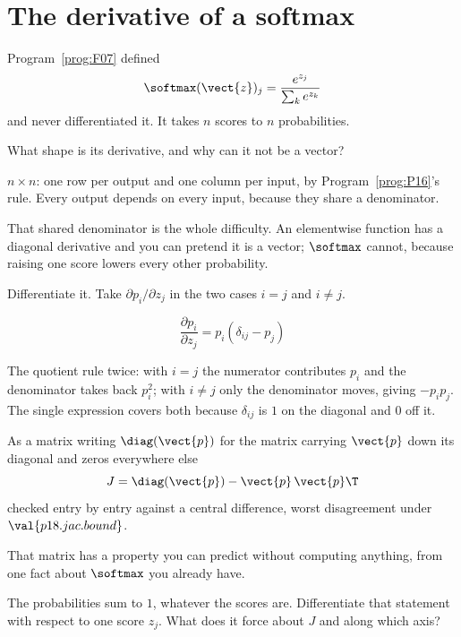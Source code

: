\section{The derivative of a softmax}
\label{sec:P18-softmax-jacobian}

\begin{fr}
Program~\ref{prog:F07} defined
\[ \softmax(\vect{z})_j = \frac{e^{z_j}}{\sum_k e^{z_k}} \]
and never differentiated it. It takes $n$ scores to $n$ probabilities.

What shape is its derivative, and why can it not be a vector?
\nextframe
\end{fr}

\begin{fr}
\begin{ansblock}
$n \times n$: one row per output and one column per input, by
Program~\ref{prog:P16}'s rule. Every output depends on every input, because
they share a denominator.
\end{ansblock}

That shared denominator is the whole difficulty. An elementwise function has
a diagonal derivative and you can pretend it is a vector; $\softmax$ cannot,
because raising one score lowers every other probability.

Differentiate it. Take $\partial p_i / \partial z_j$ in the two cases
$i = j$ and $i \neq j$.
\dotline
\nextframe
\end{fr}

\begin{fr}
\begin{ansblock}
\[ \frac{\partial p_i}{\partial z_j} = p_i(\delta_{ij} - p_j) \]
\end{ansblock}

The quotient rule twice: with $i = j$ the numerator contributes $p_i$ and the
denominator takes back $p_i^{2}$; with $i \neq j$ only the denominator moves,
giving $-p_i p_j$. The single expression covers both because $\delta_{ij}$ is
$1$ on the diagonal and $0$ off it.

As a matrix \dash{} writing $\diag(\vect{p})$ for the matrix carrying
$\vect{p}$ down its diagonal and zeros everywhere else \dash{}
\[ J = \diag(\vect{p}) - \vect{p}\,\vect{p}\T \]
checked entry by entry against a central difference, worst disagreement under
$\val{p18.jac.bound}$.
\end{fr}

\begin{fr}
That matrix has a property you can predict without computing anything, from
one fact about $\softmax$ you already have.

The probabilities sum to $1$, whatever the scores are. Differentiate that
statement with respect to one score $z_j$. What does it force about $J$
\dash{} and along which axis?
\dotline
\nextframe
\end{fr}

